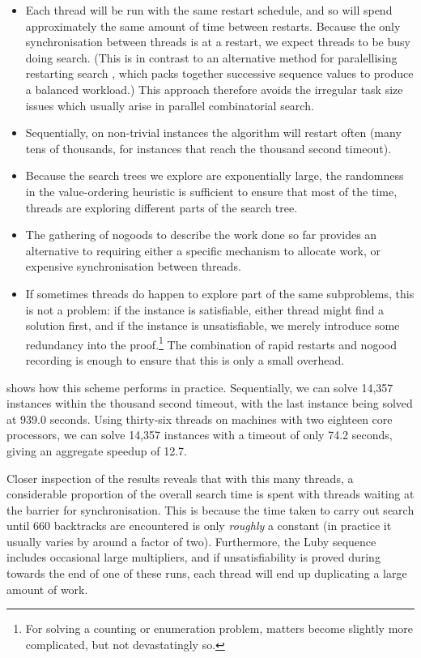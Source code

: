 \documentclass[runningheads]{llncs}
\begin{document}
\begin{itemize}
    \item Each thread will be run with the same restart schedule, and so will spend approximately
        the same amount of time between restarts. Because the only synchronisation between threads
        is at a restart, we expect threads to be busy doing search.  (This is in contrast
        to an alternative method for paralellising restarting search \cite{DBLP:conf/aaai/CireKS14},
        which packs together successive sequence values to produce a balanced workload.) This
        approach therefore avoids the irregular task size issues which usually arise in parallel
        combinatorial search.
    \item Sequentially, on non-trivial instances the algorithm will restart often (many
        tens of thousands, for instances that reach the thousand second timeout).
    \item Because the search trees we explore are exponentially large, the randomness in the
        value-ordering heuristic is sufficient to ensure that most of the time, threads are
        exploring different parts of the search tree.
    \item The gathering of nogoods to describe the work done so far provides an alternative to
        requiring either a specific mechanism to allocate work, or expensive synchronisation between threads.
    \item If sometimes threads do happen to explore part of
        the same subproblems, this is not a problem: if the instance is satisfiable, either thread
        might find a solution first, and if the instance is unsatisfiable, we merely introduce some
        redundancy into the proof.\footnote{For solving a counting or enumeration problem,
        matters become slightly more complicated, but not devastatingly so.} The combination of
        rapid restarts and nogood recording is enough to ensure that this is only a small overhead.
\end{itemize}

 shows how this scheme performs in practice. Sequentially, we can solve 14,357
instances within the thousand second timeout, with the last instance being solved at 939.0 seconds.
Using thirty-six threads on machines with two eighteen core processors, we can solve 14,357
instances with a timeout of only 74.2 seconds, giving an aggregate speedup
\cite{DBLP:conf/cpaior/HoffmannMNPRS018} of 12.7.

Closer inspection of the results reveals that with this many threads, a considerable proportion of
the overall search time is spent with threads waiting at the barrier for synchronisation. This is
because the time taken to carry out search until 660 backtracks are encountered is only
\emph{roughly} a constant (in practice it usually varies by around a factor of two). Furthermore,
the Luby sequence includes occasional large multipliers, and if unsatisfiability is proved during
towards the end of one of these runs, each thread will end up duplicating a large amount of work.
\end{document}
